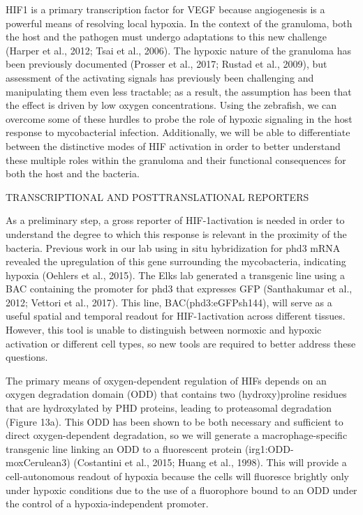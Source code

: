 HIF1\textalpha{} is a primary transcription factor for VEGF because angiogenesis is a powerful means of resolving local hypoxia. In the context of the granuloma, both the host and the pathogen must undergo adaptations to this new challenge (Harper et al., 2012; Tsai et al., 2006). The hypoxic nature of the granuloma has been previously documented (Prosser et al., 2017; Rustad et al., 2009), but assessment of the activating signals has previously been challenging and manipulating them even less tractable; as a result, the assumption has been that the effect is driven by low oxygen concentrations. Using the zebrafish, we can overcome some of these hurdles to probe the role of hypoxic signaling in the host response to mycobacterial infection. Additionally, we will be able to differentiate between the distinctive modes of HIF activation in order to better understand these multiple roles within the granuloma and their functional consequences for both the host and the bacteria. 

TRANSCRIPTIONAL AND POSTTRANSLATIONAL REPORTERS

As a preliminary step, a gross reporter of HIF-1\textalpha activation is needed in order to understand the degree to which this response is relevant in the proximity of the bacteria. Previous work in our lab using in situ hybridization for phd3 mRNA revealed the upregulation of this gene surrounding the mycobacteria, indicating hypoxia (Oehlers et al., 2015). The Elks lab generated a transgenic line using a BAC containing the promoter for phd3 that expresses GFP (Santhakumar et al., 2012; Vettori et al., 2017). This line, BAC(phd3:eGFPsh144), will serve as a useful spatial and temporal readout for HIF-1\textalpha activation across different tissues. However, this tool is unable to distinguish between normoxic and hypoxic activation or different cell types, so new tools are required to better address these questions. 

The primary means of oxygen-dependent regulation of HIFs depends on an oxygen degradation domain (ODD) that contains two (hydroxy)proline residues that are hydroxylated by PHD proteins, leading to proteasomal degradation (Figure 13a). This ODD has been shown to be both necessary and sufficient to direct oxygen-dependent degradation, so we will generate a macrophage-specific transgenic line linking an ODD to a fluorescent protein (irg1:ODD-moxCerulean3) (Costantini et al., 2015; Huang et al., 1998). This will provide a cell-autonomous readout of hypoxia because the cells will fluoresce brightly only under hypoxic conditions due to the use of a fluorophore bound to an ODD under the control of a hypoxia-independent promoter.

